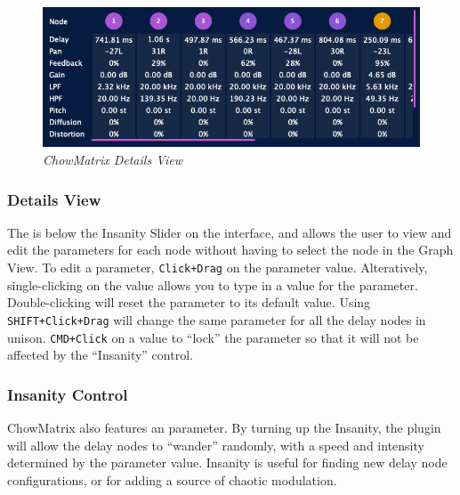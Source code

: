 \documentclass[landscape,twocolumn,a5paper]{manual}
\begin{document}
\begin{figure}[ht]
    \center
    \includegraphics[width=0.75\columnwidth]{screenshots/DetailsView.png}
    \caption{\label{fig:details_view}{\it ChowMatrix Details View}}
\end{figure}

\subsubsection{Details View}
The  is below the Insanity Slider
on the interface, and allows the user to view and edit the
parameters for each node without having to select the node
in the Graph View.
\newpar
To edit a parameter, \texttt{Click+Drag} on the parameter
value. Alteratively, single-clicking on the value allows
you to type in a value for the parameter. Double-clicking
will reset the parameter to its default value.
\newpar
Using \texttt{SHIFT+Click+Drag} will change the same parameter
for all the delay nodes in unison. \texttt{CMD+Click} on a value
to ``lock'' the parameter so that it will not be affected by the
``Insanity'' control.

\subsubsection{Insanity Control}
ChowMatrix also features an  parameter.
By turning up the Insanity, the plugin will allow the delay
nodes to ``wander'' randomly, with a speed and intensity
determined by the parameter value. Insanity is useful for
finding new delay node configurations, or for adding a source
of chaotic modulation.
\end{document}
